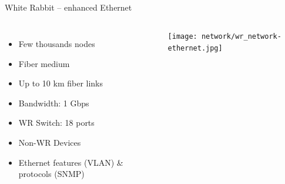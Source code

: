 \documentclass[compress,red]{beamer}
\begin{document}
\subsection{}
\begin{frame}{White Rabbit -- enhanced Ethernet}

\begin{columns}[c]
 

  \begin{itemize}
    \item Few thousands nodes
    \item Fiber medium
    \item Up to 10 km fiber links
    \item Bandwidth: 1 Gbps
    \item WR Switch: 18 ports
    \item Non-WR Devices
    \item Ethernet features (VLAN) \& protocols (SNMP)
  \end{itemize}

    \begin{center}
    \texttt{[image: network/wr\_network-ethernet.jpg]}
    

    \end{center}
\end{columns}

\end{frame}
\end{document}
